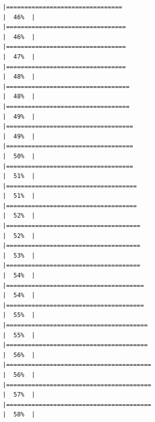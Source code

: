 \documentclass[
  ignorenonframetext,
]{beamer}
\begin{document}
\begin{frame}[fragile]{}
\begin{verbatim}
|================================                                      |  46%  |                                                                              |=================================                                     |  46%  |                                                                              |=================================                                     |  47%  |                                                                              |=================================                                     |  48%  |                                                                              |==================================                                    |  48%  |                                                                              |==================================                                    |  49%  |                                                                              |===================================                                   |  49%  |                                                                              |===================================                                   |  50%  |                                                                              |===================================                                   |  51%  |                                                                              |====================================                                  |  51%  |                                                                              |====================================                                  |  52%  |                                                                              |=====================================                                 |  52%  |                                                                              |=====================================                                 |  53%  |                                                                              |=====================================                                 |  54%  |                                                                              |======================================                                |  54%  |                                                                              |======================================                                |  55%  |                                                                              |=======================================                               |  55%  |                                                                              |=======================================                               |  56%  |                                                                              |========================================                              |  56%  |                                                                              |========================================                              |  57%  |                                                                              |========================================                              |  58%  |                                                      
\end{verbatim}
\end{frame}
\end{document}
